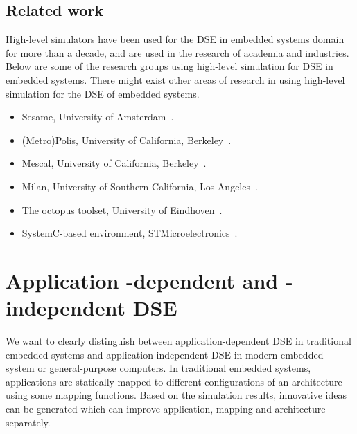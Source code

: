 \documentclass{article}
\begin{document}
\subsection{Related work}

High-level simulators have been used for the DSE in embedded systems domain for more
than a decade, and are used in the research of academia and industries. Below
are some of the research groups using high-level simulation for DSE in
embedded systems. There might exist other areas of research in using high-level
simulation for the DSE of embedded systems. 

\begin{itemize}

\item Sesame, University of Amsterdam~\cite{Erbas:2007:FSM:1317032.1317034}.

\item (Metro)Polis, University of California,
Berkeley~\cite{Yang_parallelsimulation}.

\item Mescal, University of California, Berkeley~\cite{mescal}.

\item Milan, University of Southern California, Los
Angeles~\cite{Bakshi01milan:a}.

\item The octopus toolset, University of
Eindhoven~\cite{Basten:2010:MDE:1939281.1939293}.

\item SystemC-based environment, STMicroelectronics~\cite{1231975}.

\end{itemize}

\section{Application -dependent and -independent DSE}
\label{sn:application-dep-indep-dse}

We want to clearly distinguish between application-dependent DSE in traditional
embedded systems and application-independent DSE in modern embedded system or
general-purpose computers. In traditional embedded systems, applications are
statically mapped to different configurations of an architecture using some
mapping functions. Based on the simulation results, innovative ideas can be
generated which can improve application, mapping and architecture separately.
\end{document}
